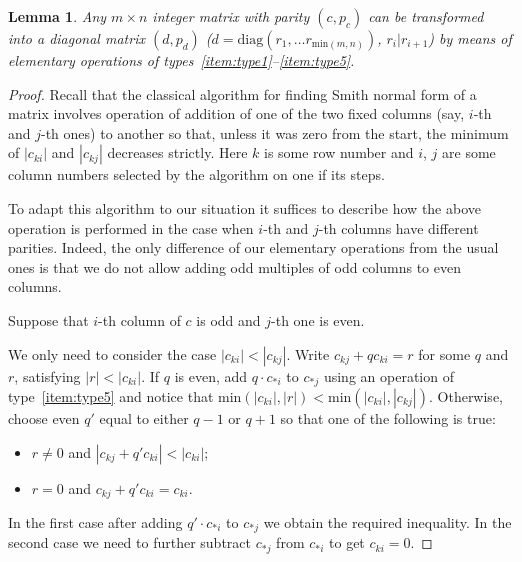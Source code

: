 \documentclass[oneside, 10pt]{amsart}
\theoremstyle{plain}
\newtheorem{lemma}{Lemma}
\theoremstyle{remark}
\theoremstyle{definition}
\begin{document}
\begin{lemma} \label{lm:normal-form} Any $m \times n$ integer matrix with parity $(c, p_c)$ can be transformed into a diagonal matrix $(d, p_d)$
  ($d = \mathrm{diag}(r_1, \ldots r_{\mathrm{min}(m, n)})$, $r_i | r_{i+1}$)
   by means of elementary operations of types~\eqref{item:type1}--\eqref{item:type5}.
\end{lemma}
\begin{proof} 
Recall that the classical algorithm for finding Smith normal form of a matrix involves
 operation of addition of one of the two fixed columns (say, $i$-th and $j$-th ones) to another
 so that, unless it was zero from the start, the minimum of $|c_{ki}|$ and $|c_{kj}|$ decreases strictly. 
 Here $k$ is some row number and $i$, $j$ are some column numbers selected by the algorithm on one if its steps.

To adapt this algorithm to our situation it suffices to describe
 how the above operation is performed in the case when $i$-th and $j$-th columns have different parities.
Indeed, the only difference of our elementary operations from the usual ones is that
 we do not allow adding odd multiples of odd columns to even columns.

Suppose that $i$-th column of $c$ is odd and $j$-th one is even.


We only need to consider the case $|c_{ki}| < |c_{kj}|$. Write $c_{kj} + q c_{ki} = r$ for some $q$ and $r$, satisfying $|r| < |c_{ki}|$.
If $q$ is even, add $q \cdot c_{*i}$ to $c_{*j}$ using an operation of type~\eqref{item:type5} and 
 notice that $\mathrm{min}(|c_{ki}|,|r|) < \mathrm{min}(|c_{ki}|,|c_{kj}|)$.
Otherwise, choose even $q'$ equal to either $q-1$ or $q+1$ so that one of the following is true:
\begin{itemize}
 \item $r\neq 0$ and $|c_{kj} + q' c_{ki}| < |c_{ki}|$;
 \item $r = 0$ and $c_{kj} + q' c_{ki} = c_{ki}$.
\end{itemize}
In the first case after adding $q' \cdot c_{*i}$ to $c_{*j}$ we obtain the required inequality.
In the second case we need to further subtract $c_{*j}$ from $c_{*i}$ to get $c_{ki} = 0$.
\end{proof}
\end{document}
